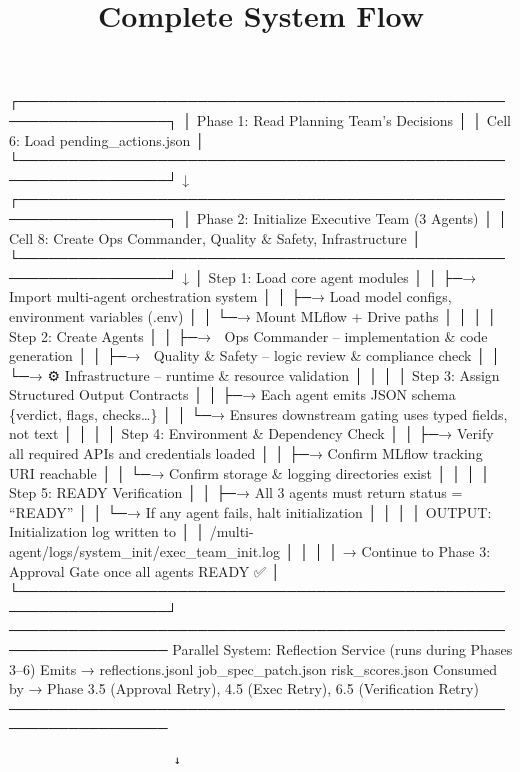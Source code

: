 \documentclass[
]{article}
\title{Complete System Flow}
\author{}
\date{\vspace{-2.5em}}
\begin{document}
\maketitle

┌─────────────────────────────────────────────────────────────────┐ │
Phase 1: Read Planning Team's Decisions │ │ Cell 6: Load
pending\_actions.json │
└─────────────────────────────────────────────────────────────────┘ ↓
┌─────────────────────────────────────────────────────────────────┐ │
Phase 2: Initialize Executive Team (3 Agents) │ │ Cell 8: Create Ops
Commander, Quality \& Safety, Infrastructure │
└─────────────────────────────────────────────────────────────────┘ ↓ │
Step 1: Load core agent modules │ │ ├─→ Import multi-agent orchestration
system │ │ ├─→ Load model configs, environment variables (.env) │ │ └─→
Mount MLflow + Drive paths │ │ │ │ Step 2: Create Agents │ │ ├─→ 🧭 Ops
Commander -- implementation \& code generation │ │ ├─→ 🧩 Quality \&
Safety -- logic review \& compliance check │ │ └─→ ⚙️ Infrastructure --
runtime \& resource validation │ │ │ │ Step 3: Assign Structured Output
Contracts │ │ ├─→ Each agent emits JSON schema \{verdict, flags,
checks\ldots\} │ │ └─→ Ensures downstream gating uses typed fields, not
text │ │ │ │ Step 4: Environment \& Dependency Check │ │ ├─→ Verify all
required APIs and credentials loaded │ │ ├─→ Confirm MLflow tracking URI
reachable │ │ └─→ Confirm storage \& logging directories exist │ │ │ │
Step 5: READY Verification │ │ ├─→ All 3 agents must return status =
``READY'' │ │ └─→ If any agent fails, halt initialization │ │ │ │
OUTPUT: Initialization log written to │ │
/multi-agent/logs/system\_init/exec\_team\_init.log │ │ │ │ → Continue
to Phase 3: Approval Gate once all agents READY ✅ │
└─────────────────────────────────────────────────────────────────┘
──────────────────────────────────────────────────────────────────
Parallel System: Reflection Service (runs during Phases 3--6) Emits →
reflections.jsonl \textbar{} job\_spec\_patch.json \textbar{}
risk\_scores.json Consumed by → Phase 3.5 (Approval Retry), 4.5 (Exec
Retry), 6.5 (Verification Retry)
──────────────────────────────────────────────────────────────────

\begin{verbatim}
                       ↓
\end{verbatim}
\end{document}
